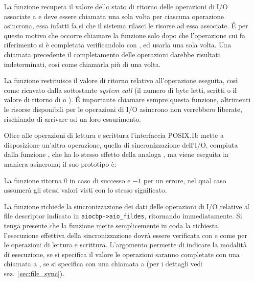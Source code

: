 La funzione recupera il valore dello stato di ritorno delle operazioni di I/O
associate a  e deve essere chiamata una sola volta per ciascuna
operazione asincrona, essa infatti fa sì che il sistema rilasci le risorse ad
essa associate. É per questo motivo che occorre chiamare la funzione solo dopo
che l'operazione cui  fa riferimento si è completata
verificandolo con , ed usarla una sola volta. Una chiamata
precedente il completamento delle operazioni darebbe risultati indeterminati,
così come chiamarla più di una volta.

La funzione restituisce il valore di ritorno relativo all'operazione eseguita,
così come ricavato dalla sottostante \textit{system call} (il numero di byte
letti, scritti o il valore di ritorno di  o ).  É
importante chiamare sempre questa funzione, altrimenti le risorse disponibili
per le operazioni di I/O asincrono non verrebbero liberate, rischiando di
arrivare ad un loro esaurimento.

Oltre alle operazioni di lettura e scrittura l'interfaccia POSIX.1b mette a
disposizione un'altra operazione, quella di sincronizzazione dell'I/O,
compiuta dalla funzione , che ha lo stesso effetto della
analoga , ma viene eseguita in maniera asincrona; il suo prototipo
è:

\begin{funcproto}{
}

{La funzione ritorna $0$ in caso di successo e $-1$ per un errore, nel qual
  caso  assumerà gli stessi valori visti  con lo
  stesso significato.
}
\end{funcproto}

La funzione richiede la sincronizzazione dei dati delle operazioni di I/O
relative al file descriptor indicato in \texttt{aiocbp->aio\_fildes},
ritornando immediatamente. Si tenga presente che la funzione mette
semplicemente in coda la richiesta, l'esecuzione effettiva della
sincronizzazione dovrà essere verificata con  e
 come per le operazioni di lettura e
scrittura. L'argomento  permette di indicare la modalità di
esecuzione, se si specifica il valore  le operazioni saranno
completate con una chiamata a , se si specifica
 con una chiamata a  (per i dettagli vedi
sez.~\ref{sec:file_sync}).

